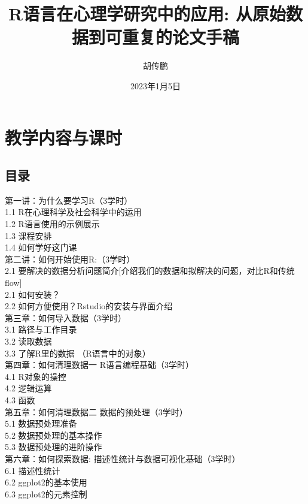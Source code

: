 \documentclass[
  oneside]{book}
\title{R语言在心理学研究中的应用: 从原始数据到可重复的论文手稿}
\author{胡传鹏}
\date{2023年1月5日}
\begin{document}
\maketitle

{
\setcounter{tocdepth}{1}
\tableofcontents
}
\hypertarget{0-index}{%
\chapter{教学内容与课时}\label{0-index}}

\hypertarget{ux76eeux5f55}{%
\section{目录}\label{ux76eeux5f55}}

第一讲：为什么要学习R（3学时）\\
1.1 R在心理科学及社会科学中的运用\\
1.2 R语言使用的示例展示\\
1.3 课程安排\\
1.4 如何学好这门课\\

第二讲：如何开始使用R:（3学时）\\
2.1 要解决的数据分析问题简介{[}介绍我们的数据和拟解决的问题，对比R和传统flow{]}\\
2.1 如何安装？\\
2.2 如何方便使用？Rstudio的安装与界面介绍\\

第三章：如何导入数据（3学时）\\
3.1 路径与工作目录\\
3.2 读取数据\\
3.3 了解R里的数据 （R语言中的对象）\\

第四章：如何清理数据一 R语言编程基础（3学时）\\
4.1 R对象的操控\\
4.2 逻辑运算\\
4.3 函数\\

第五章：如何清理数据二 数据的预处理（3学时）\\
5.1 数据预处理准备\\
5.2 数据预处理的基本操作\\
5.3 数据预处理的进阶操作\\

第六章：如何探索数据: 描述性统计与数据可视化基础（3学时）\\
6.1 描述性统计\\
6.2 ggplot2的基本使用\\
6.3 ggplot2的元素控制\\
\end{document}

